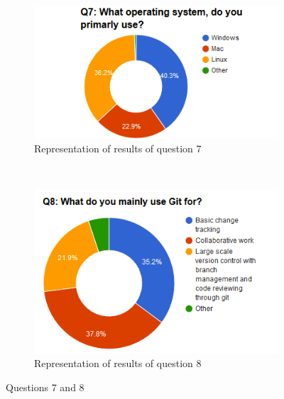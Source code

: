 \documentclass[a4paper,oneside]{bth} %
\begin{document}
		\begin{figure}[H]
			\centering
			\begin{subfigure}[b]{0.45\textwidth}
				\includegraphics[width=\textwidth]{graphs/q7.png}
				\caption{Representation of results of question 7}
				\label{fig:q7}
			\end{subfigure}
			~
			\begin{subfigure}[b]{0.45\textwidth}
				\includegraphics[width=\textwidth]{graphs/q8.png}
				\caption{Representation of results of question 8}
				\label{fig:q8}
			\end{subfigure}
			\caption{Questions 7 and 8}\label{fig:q7-q8}
		\end{figure}
\end{document}
